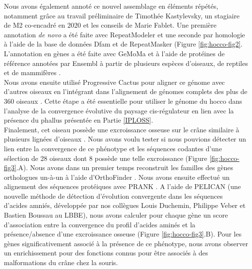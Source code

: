 Nous avons également annoté ce nouvel assemblage en éléments répétés, notamment grâce au travail préliminaire de Timothée Kastylevsky, un stagiaire de M2 co-encadré en 2020 et les conseils de Marie Fablet. Une première annotation \textit{de novo} a été faite avec RepeatModeler \citep{flynn_repeatmodeler2_2020} et une seconde par homologie à l’aide de la base de données Dfam et de RepeatMasker \citep{smit_repeatmasker_2013} (Figure \ref{fig:hocco-fig2}. L’annotation en gènes a été faite avec GeMoMa \citep{kollmar_gemoma_2019} et à l’aide de protéines de référence annotées par Ensembl à partir de plusieurs espèces d’oiseaux, de reptiles et de mammifères \citep{cunningham_ensembl_2019}. \\

Nous avons ensuite utilisé Progressive Cactus \citep{armstrong_progressive_2020} pour aligner ce génome avec d’autres oiseaux en l’intégrant dans l’alignement de génomes complets des plus de 360 oiseaux \citep{feng_dense_2020}. Cette étape a été essentielle pour utiliser le génome du hocco dans l’analyse de la convergence évolutive du paysage \gls{cis}-régulateur en lien avec la présence du phallus présentée en Partie \ref{IPLOSS}. \\

Finalement, cet oiseau possède une excroissance osseuse sur le crâne similaire à plusieurs lignées d’oiseaux \citep{mayr_survey_2018}. Nous avons voulu tester si nous pouvions détecter un lien entre la convergence de ce phénotype et les séquences codantes d'une sélection de 28 oiseaux dont 8 possède une telle excroissance (Figure \ref{fig:hocco-fig3}.A). Nous avons dans un premier temps reconstruit les familles des gènes orthologues un-à-un à l’aide d’OrthoFinder \citep{emms_orthofinder_2019}. Nous avons ensuite effectué un alignement des séquences protéiques avec PRANK \citep{loytynoja_phylogeny-aware_2014}. A l'aide de PELICAN (une nouvelle méthode de détection d'évolution convergente dans les séquences d'acides amniés, développée par nos collègues Louis Duchemin, Philippe Veber et Bastien Boussau au LBBE), nous avons calculer pour chaque gène un score d'association entre la convergence du profil d’acides aminés et la présence/absence d'une excroissance osseuse (Figure \ref{fig:hocco-fig3}.B). Pour les gènes significativement associé à la présence de ce phénotype, nous avons observer un enrichissement pour des fonctions connus pour être associés à des malformations du crâne chez la souris. \\

